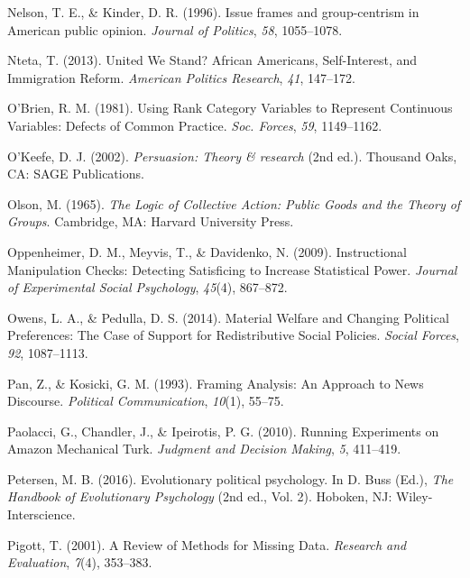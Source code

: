 \documentclass[12pt,econ]{sources/authesis}
\begin{document}
\leavevmode\hypertarget{ref-nelson_1996_issue}{}%
Nelson, T. E., \& Kinder, D. R. (1996). Issue frames and group-centrism in American public opinion. \emph{Journal of Politics}, \emph{58}, 1055--1078.

\leavevmode\hypertarget{ref-nteta_2013_united}{}%
Nteta, T. (2013). United We Stand? African Americans, Self-Interest, and Immigration Reform. \emph{American Politics Research}, \emph{41}, 147--172.

\leavevmode\hypertarget{ref-obrien_1981_using}{}%
O'Brien, R. M. (1981). Using Rank Category Variables to Represent Continuous Variables: Defects of Common Practice. \emph{Soc. Forces}, \emph{59}, 1149--1162.

\leavevmode\hypertarget{ref-okeefe_2002_persuasion}{}%
O'Keefe, D. J. (2002). \emph{Persuasion: Theory \& research} (2nd ed.). Thousand Oaks, CA: SAGE Publications.

\leavevmode\hypertarget{ref-olson_logic_1965}{}%
Olson, M. (1965). \emph{The Logic of Collective Action: Public Goods and the Theory of Groups}. Cambridge, MA: Harvard University Press.

\leavevmode\hypertarget{ref-oppenheimer_2009_instructional}{}%
Oppenheimer, D. M., Meyvis, T., \& Davidenko, N. (2009). Instructional Manipulation Checks: Detecting Satisficing to Increase Statistical Power. \emph{Journal of Experimental Social Psychology}, \emph{45}(4), 867--872.

\leavevmode\hypertarget{ref-owens_2014_material}{}%
Owens, L. A., \& Pedulla, D. S. (2014). Material Welfare and Changing Political Preferences: The Case of Support for Redistributive Social Policies. \emph{Social Forces}, \emph{92}, 1087--1113.

\leavevmode\hypertarget{ref-pan_framing_1993}{}%
Pan, Z., \& Kosicki, G. M. (1993). Framing Analysis: An Approach to News Discourse. \emph{Political Communication}, \emph{10}(1), 55--75.

\leavevmode\hypertarget{ref-paolacci_2010_running}{}%
Paolacci, G., Chandler, J., \& Ipeirotis, P. G. (2010). Running Experiments on Amazon Mechanical Turk. \emph{Judgment and Decision Making}, \emph{5}, 411--419.

\leavevmode\hypertarget{ref-petersen_2016_evolutionary}{}%
Petersen, M. B. (2016). Evolutionary political psychology. In D. Buss (Ed.), \emph{The Handbook of Evolutionary Psychology} (2nd ed., Vol. 2). Hoboken, NJ: Wiley-Interscience.

\leavevmode\hypertarget{ref-pigott_review_2001}{}%
Pigott, T. (2001). A Review of Methods for Missing Data. \emph{Research and Evaluation}, \emph{7}(4), 353--383.
\end{document}

